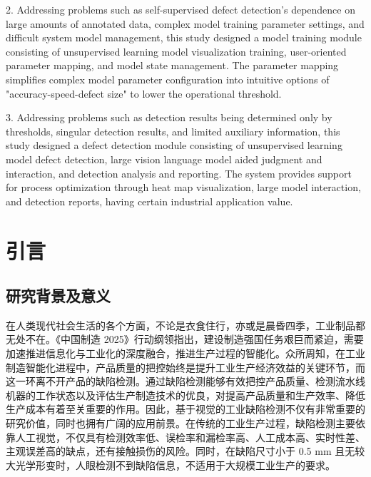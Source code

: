\documentclass[
  ]{njuthesis}
\begin{document}
\begin{abstract*}
2. Addressing problems such as self-supervised defect detection's dependence on large amounts of annotated data, complex model training parameter settings, and difficult system model management, this study designed a model training module consisting of unsupervised learning model visualization training, user-oriented parameter mapping, and model state management. The parameter mapping simplifies complex model parameter configuration into intuitive options of "accuracy-speed-defect size" to lower the operational threshold.

3. Addressing problems such as detection results being determined only by thresholds, singular detection results, and limited auxiliary information, this study designed a defect detection module consisting of unsupervised learning model defect detection, large vision language model aided judgment and interaction, and detection analysis and reporting. The system provides support for process optimization through heat map visualization, large model interaction, and detection reports, having certain industrial application value.
\end{abstract*}

\tableofcontents
\listoffigures
\listoftables

\mainmatter

\chapter{引言}

\section{研究背景及意义}

在人类现代社会生活的各个方面，不论是衣食住行，亦或是晨昏四季，工业制品都无处不在。《中国制造 2025》行动纲领指出，建设制造强国任务艰巨而紧迫，需要加速推进信息化与工业化的深度融合，推进生产过程的智能化\cite{[1]}。众所周知，在工业制造智能化进程中，产品质量的把控始终是提升工业生产经济效益的关键环节，而这一环离不开产品的缺陷检测。通过缺陷检测能够有效把控产品质量、检测流水线机器的工作状态以及评估生产制造技术的优良，对提高产品质量和生产效率、降低生产成本有着至关重要的作用\cite{[2]}。因此，基于视觉的工业缺陷检测不仅有非常重要的研究价值，同时也拥有广阔的应用前景\cite{[1]}。在传统的工业生产过程，缺陷检测主要依靠人工视觉，不仅具有检测效率低、误检率和漏检率高、人工成本高、实时性差、主观误差高的缺点，还有接触损伤的风险。同时，在缺陷尺寸小于 0.5 mm 且无较大光学形变时，人眼检测不到缺陷信息，不适用于大规模工业生产的要求\cite{[3]}。
\end{document}

